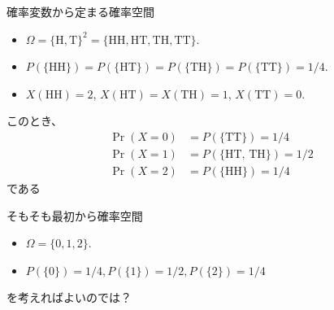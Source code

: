 \documentclass[lualatex,handout]{beamer}
\theoremstyle{definition}
\begin{document}
\begin{frame}{確率変数から定まる確率空間}
\begin{example}
\begin{itemize}
\item $\Omega = \{\mathrm{H},\mathrm{T}\}^2 = \{\mathrm{HH},\mathrm{HT},\mathrm{TH},\mathrm{TT}\}$.
\item $P(\{\mathrm{HH}\})=P(\{\mathrm{HT}\})=P(\{\mathrm{TH}\})=P(\{\mathrm{TT}\})=1/4$.
\item $X(\mathrm{HH})=2$, $X(\mathrm{HT})=X(\mathrm{TH})=1$, $X(\mathrm{TT})=0$.
\end{itemize}

このとき、
\begin{align*}
\Pr(X = 0) &= P(\{\mathrm{TT}\}) = 1/4\\
\Pr(X = 1) &= P(\{\mathrm{HT,\,TH}\}) = 1/2\\
\Pr(X = 2) &= P(\{\mathrm{HH}\}) = 1/4
\end{align*}
である
\end{example}
\begin{center}
そもそも最初から確率空間
\begin{itemize}
\item $\Omega = \{0,1,2\}$.
\item $P(\{0\}) = 1/4, P(\{1\}) = 1/2, P(\{2\}) = 1/4$
\end{itemize}

を考えればよいのでは？
\end{center}
\end{frame}
\end{document}
